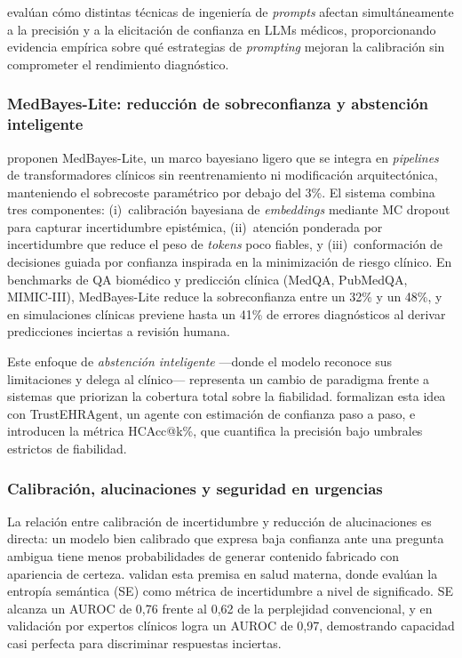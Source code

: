 \textcite{Naderi2025prompt} evalúan cómo distintas técnicas de ingeniería de \emph{prompts} afectan simultáneamente a la precisión y a la elicitación de confianza en \ac{LLM}s médicos, proporcionando evidencia empírica sobre qué estrategias de \emph{prompting} mejoran la calibración sin comprometer el rendimiento diagnóstico.

\subsubsection{MedBayes-Lite: reducción de sobreconfianza y abstención inteligente}

\textcite{hossain2025} proponen MedBayes-Lite, un marco bayesiano ligero que se integra en \emph{pipelines} de transformadores clínicos sin reentrenamiento ni modificación arquitectónica, manteniendo el sobrecoste paramétrico por debajo del 3\%. El sistema combina tres componentes: (i)~calibración bayesiana de \emph{embeddings} mediante MC dropout para capturar incertidumbre epistémica, (ii)~atención ponderada por incertidumbre que reduce el peso de \emph{tokens} poco fiables, y (iii)~conformación de decisiones guiada por confianza inspirada en la minimización de riesgo clínico. En benchmarks de QA biomédico y predicción clínica (MedQA, PubMedQA, \ac{MIMIC}-III), MedBayes-Lite reduce la sobreconfianza entre un 32\% y un 48\%, y en simulaciones clínicas previene hasta un 41\% de errores diagnósticos al derivar predicciones inciertas a revisión humana.

Este enfoque de \emph{abstención inteligente} ---donde el modelo reconoce sus limitaciones y delega al clínico--- representa un cambio de paradigma frente a sistemas que priorizan la cobertura total sobre la fiabilidad. \textcite{Song2025trustehragent} formalizan esta idea con TrustEHRAgent, un agente con estimación de confianza paso a paso, e introducen la métrica HCAcc@k\%, que cuantifica la precisión bajo umbrales estrictos de fiabilidad.

\subsubsection{Calibración, alucinaciones y seguridad en urgencias}

La relación entre calibración de incertidumbre y reducción de alucinaciones es directa: un modelo bien calibrado que expresa baja confianza ante una pregunta ambigua tiene menos probabilidades de generar contenido fabricado con apariencia de certeza. \textcite{pennydimri2025} validan esta premisa en salud materna, donde evalúan la entropía semántica (SE) como métrica de incertidumbre a nivel de significado. SE alcanza un AUROC de 0,76 frente al 0,62 de la perplejidad convencional, y en validación por expertos clínicos logra un AUROC de 0,97, demostrando capacidad casi perfecta para discriminar respuestas inciertas.

